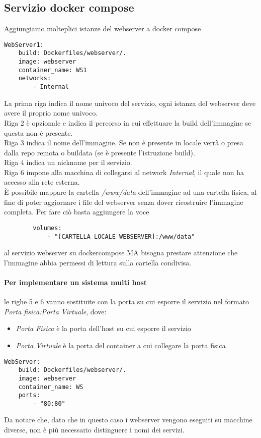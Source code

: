 \documentclass[../DocumentazioneProgetto.tex]{subfiles}
\begin{document}
	\subsection{Servizio docker compose} 
	\label{sec:WebserverDockerCompose}
	Aggiungiamo molteplici istanze del webserver a docker compose
	\begin{lstlisting}[caption=Webserver Docker Compose] 
WebServer1:
	build: Dockerfiles/webserver/.
	image: webserver
	container_name: WS1
	networks:
		- Internal\end{lstlisting}
	La prima riga indica il nome univoco del servizio, ogni istanza del webserver deve avere il proprio nome univoco.\\
	Riga 2 è opzionale e indica il percorso in cui effettuare la build dell'immagine se questa non è presente.\\
	Riga 3 indica il nome dell'immagine. Se non è presente in locale verrà o presa dalla repo remota o buildata (se è presente l'istruzione build).\\
	Riga 4 indica un nickname per il servizio.\\
	Riga 6 impone alla macchina di collegarsi al network \textit{Internal}, il quale non ha accesso alla rete esterna.\\
	È possibile mappare la cartella \textit{/www/data} dell'immagine ad una cartella fisica, al fine di poter aggiornare i file del webserver senza dover ricostruire l'immagine completa.
	Per fare ciò basta aggiungere la voce
	\begin{lstlisting} 
		volumes:
            - "[CARTELLA LOCALE WEBSERVER]:/www/data"\end{lstlisting} 
	al servizio webserver su dockercompose MA bisogna prestare attenzione che l'immagine abbia permessi di lettura sulla cartella condivisa.
	\paragraph{Per implementare un sistema multi host} le righe 5 e 6 vanno sostituite con la porta su cui esporre il servizio nel formato \textit{Porta fisica:Porta Virtuale}, 
	dove:
	\begin{itemize}
		\item \textit{Porta Fisica} è la porta dell'host su cui esporre il servizio
		\item \textit{Porta Virtuale} è la porta del container a cui collegare la porta fisica 
	\end{itemize}
	\begin{lstlisting}[caption=Webserver Docker Compose in multi host] 
WebServer:
	build: Dockerfiles/webserver/.
	image: webserver
	container_name: WS
	ports:
		- "80:80"\end{lstlisting}
	Da notare che, dato che in questo caso i webserver vengono eseguiti su macchine diverse, non è più necessario distinguere i nomi dei servizi.
\end{document}
